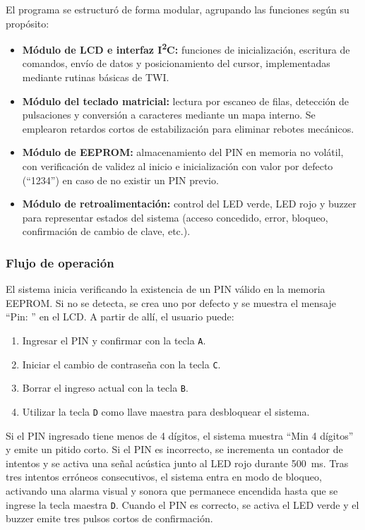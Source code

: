 El programa se estructuró de forma modular, agrupando las funciones según su propósito:
\begin{itemize}
    \item \textbf{Módulo de LCD e interfaz I\textsuperscript{2}C:} funciones de inicialización, escritura de comandos, envío de datos y posicionamiento del cursor, 
    implementadas mediante rutinas básicas de TWI.
    \item \textbf{Módulo del teclado matricial:} lectura por escaneo de filas, detección de pulsaciones y conversión a caracteres mediante un mapa interno. 
    Se emplearon retardos cortos de estabilización para eliminar rebotes mecánicos.
    \item \textbf{Módulo de EEPROM:} almacenamiento del PIN en memoria no volátil, con verificación de validez al inicio 
    e inicialización con valor por defecto (“1234”) en caso de no existir un PIN previo.
    \item \textbf{Módulo de retroalimentación:} control del LED verde, LED rojo y buzzer para representar estados del sistema 
    (acceso concedido, error, bloqueo, confirmación de cambio de clave, etc.).
\end{itemize}

\subsubsection{Flujo de operación}

El sistema inicia verificando la existencia de un PIN válido en la memoria EEPROM. 
Si no se detecta, se crea uno por defecto y se muestra el mensaje “Pin: ” en el LCD.  
A partir de allí, el usuario puede:
\begin{enumerate}
    \item Ingresar el PIN y confirmar con la tecla \texttt{A}.  
    \item Iniciar el cambio de contraseña con la tecla \texttt{C}.  
    \item Borrar el ingreso actual con la tecla \texttt{B}.  
    \item Utilizar la tecla \texttt{D} como llave maestra para desbloquear el sistema.
\end{enumerate}

Si el PIN ingresado tiene menos de 4 dígitos, el sistema muestra “Min 4 dígitos” y emite un pitido corto.  
Si el PIN es incorrecto, se incrementa un contador de intentos y se activa una señal acústica junto al LED rojo durante 500~ms.  
Tras tres intentos erróneos consecutivos, el sistema entra en modo de bloqueo, 
activando una alarma visual y sonora que permanece encendida hasta que se ingrese la tecla maestra \texttt{D}.  
Cuando el PIN es correcto, se activa el LED verde y el buzzer emite tres pulsos cortos de confirmación.

